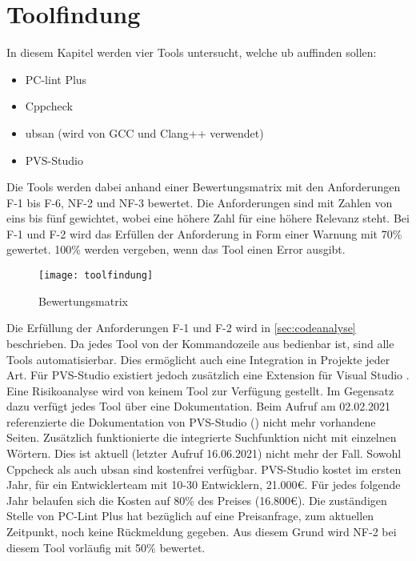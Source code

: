 \chapter{Toolfindung}
\label{ch:toolfindung}

In diesem Kapitel werden vier Tools untersucht, welche \gls{ub} auffinden sollen:
\begin{itemize}
  \item PC-lint Plus \cite{misc:pclintplus}
  \item Cppcheck \cite{misc:cppcheck}
  \item \gls{ubsan} (wird von GCC und Clang++ verwendet) \cite{misc:ubsan}
  \item PVS-Studio \cite{misc:pvsstudio}
\end{itemize}
Die Tools werden dabei anhand einer Bewertungsmatrix mit den Anforderungen F-1 bis F-6, NF-2 und NF-3 bewertet. Die Anforderungen sind mit Zahlen von eins bis fünf gewichtet, wobei
eine höhere Zahl für eine höhere Relevanz steht. Bei F-1 und F-2 wird das Erfüllen der Anforderung in Form einer Warnung mit 70\% gewertet. 100\% werden vergeben, wenn das Tool einen
Error ausgibt.
\begin{figure}[htpb]
  \centering
  \texttt{[image: toolfindung]}
  \caption{Bewertungsmatrix}
  \label{img:toolfindung}
\end{figure}

Die Erfüllung der Anforderungen F-1 und F-2 wird in \ref{sec:codeanalyse} beschrieben. \newline
Da jedes Tool von der Kommandozeile aus bedienbar ist, sind alle Tools automatisierbar. Dies ermöglicht auch eine Integration in Projekte jeder Art. Für PVS-Studio existiert jedoch
zusätzlich eine Extension für Visual Studio \cite{misc:pvsplugin}. \newline
Eine Risikoanalyse wird von keinem Tool zur Verfügung gestellt. \newline
Im Gegensatz dazu verfügt jedes Tool über eine Dokumentation. Beim Aufruf am 02.02.2021 referenzierte die Dokumentation von PVS-Studio (\cite{misc:pvsdoku}) nicht mehr vorhandene Seiten. Zusätzlich
funktionierte die integrierte Suchfunktion nicht mit einzelnen Wörtern. Dies ist aktuell (letzter Aufruf 16.06.2021) nicht mehr der Fall.\newline
Sowohl Cppcheck als auch \gls{ubsan} sind kostenfrei verfügbar. \newline
PVS-Studio kostet im ersten Jahr, für ein Entwicklerteam mit 10-30 Entwicklern, 21.000€. Für jedes folgende Jahr belaufen sich die Kosten auf 80\% des Preises (16.800€).\newline
Die zuständigen Stelle von PC-Lint Plus hat bezüglich auf eine Preisanfrage, zum aktuellen Zeitpunkt, noch keine Rückmeldung gegeben. Aus diesem Grund wird NF-2 bei diesem Tool
vorläufig mit 50\% bewertet.

